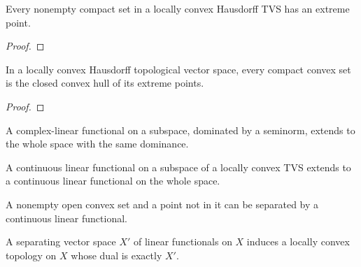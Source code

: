 \begin{theorem}
  \label{thm:krein-milman-lemma}
  \leanok
  Every nonempty compact set in a locally convex Hausdorff TVS has an
  extreme point.
\end{theorem}
\begin{proof}
  \leanok
\end{proof}

\begin{theorem}
  \label{thm:krein-milman}
  \leanok
  In a locally convex Hausdorff topological vector space, every compact
  convex set is the closed convex hull of its extreme points.
\end{theorem}
\begin{proof}
  \leanok
\end{proof}


\begin{theorem}
  \label{thm:hahn-banach-complex}
  \leanok
  A complex-linear functional on a subspace, dominated by a seminorm,
  extends to the whole space with the same dominance.
\end{theorem}

\begin{theorem}
  \label{thm:hahn-banach-cont-extension}
  \leanok
  A continuous linear functional on a subspace of a locally convex
  TVS extends to a continuous linear functional on the whole space.
\end{theorem}

\begin{theorem}
  \label{thm:hahn-banach-open-point}
  \leanok
  A nonempty open convex set and a point not in it can be separated
  by a continuous linear functional.
\end{theorem}

\begin{theorem}
  \label{thm:topology-separating-dual}
  \leanok
  A separating vector space $X'$ of linear functionals on $X$
  induces a locally convex topology on $X$ whose dual is exactly
  $X'$.
\end{theorem}

